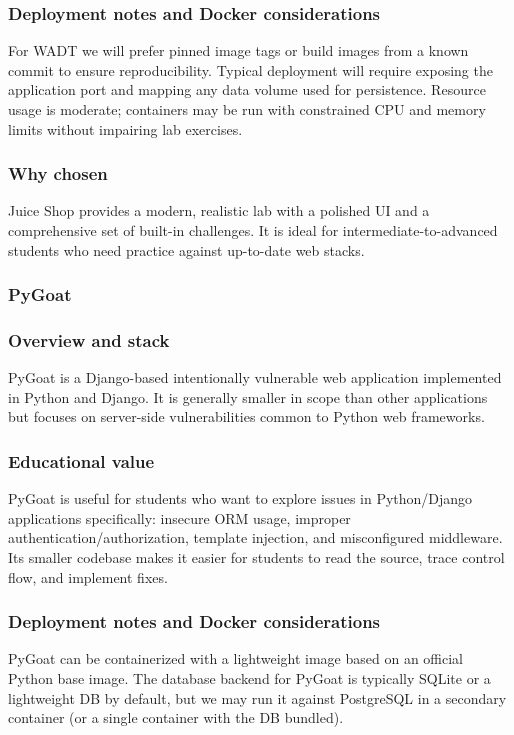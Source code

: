 \documentclass[12pt]{article}
\begin{document}
\subsubsection*{Deployment notes and Docker considerations}
For WADT we will prefer pinned image tags or build images from a known commit to ensure reproducibility. Typical deployment will require exposing the application port and mapping any data volume used for persistence. Resource usage is moderate; containers may be run with constrained CPU and memory limits without impairing lab exercises.

\subsubsection*{Why chosen}
Juice Shop provides a modern, realistic lab with a polished UI and a comprehensive set of built-in challenges. It is ideal for intermediate-to-advanced students who need practice against up-to-date web stacks.


\subsubsection{PyGoat}

\subsubsection*{Overview and stack}
PyGoat is a Django-based intentionally vulnerable web application implemented in Python and Django. It is generally smaller in scope than other applications but focuses on server-side vulnerabilities common to Python web frameworks.

\subsubsection*{Educational value}
PyGoat is useful for students who want to explore issues in Python/Django applications specifically: insecure ORM usage, improper authentication/authorization, template injection, and misconfigured middleware. Its smaller codebase makes it easier for students to read the source, trace control flow, and implement fixes.

\subsubsection*{Deployment notes and Docker considerations}
PyGoat can be containerized with a lightweight image based on an official Python base image. The database backend for PyGoat is typically SQLite or a lightweight DB by default, but we may run it against PostgreSQL in a secondary container (or a single container with the DB bundled).
\end{document}
